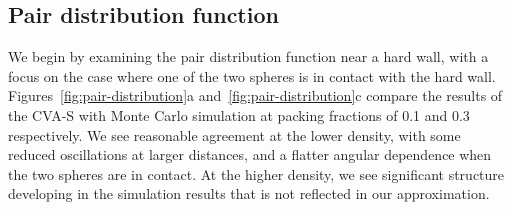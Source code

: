 \documentclass[letterpaper,twocolumn,amsmath,amssymb,pre,aps,10pt]{revtex4-1}
\begin{document}
\subsection{Pair distribution function}


We begin by examining the pair distribution function near a hard wall,
with a focus on the case where one of the two spheres is in contact
with the hard wall.  Figures~\ref{fig:pair-distribution}a
and~\ref{fig:pair-distribution}c compare the results of the CVA-S with
Monte Carlo simulation at packing fractions of 0.1 and 0.3
respectively. We see reasonable agreement at the lower density, with
some reduced oscillations at larger distances, and a flatter angular
dependence when the two spheres are in contact.  At the higher
density, we see significant structure developing in the simulation
results that is not reflected in our approximation.
\end{document}

